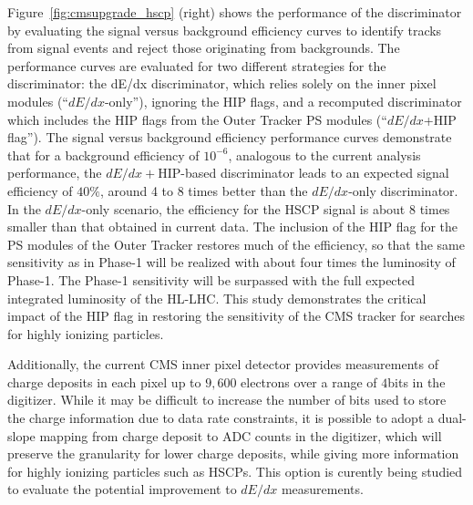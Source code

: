 Figure~\ref{fig:cmsupgrade_hscp} (right) shows the performance of the discriminator by evaluating the signal versus background
efficiency curves to identify tracks from signal events and reject those originating from backgrounds. The performance curves are evaluated for two different strategies for
the discriminator: the dE/dx discriminator, which relies solely on the inner pixel modules
(``$dE/dx$-only''), ignoring the HIP flags, and a recomputed discriminator which includes the
HIP flags from the Outer Tracker PS modules (“$dE/dx$+HIP flag”). The signal versus background
efficiency performance curves demonstrate that for a background efficiency
of $10^{-6}$, analogous to the current analysis performance, the $dE/dx+$HIP-based discriminator
leads to an expected signal efficiency of $40\%$, around 4 to 8 times better than the $dE/dx$-only
discriminator. In the $dE/dx$-only scenario, the efficiency for the HSCP signal is about 8 times
smaller than that obtained in current data. The inclusion of the HIP flag for the PS modules of the Outer Tracker restores much of the efficiency, so that the
same sensitivity as in Phase-1 will be realized with about four times the luminosity of Phase-1.
The Phase-1 sensitivity will be surpassed with the full expected integrated luminosity of the
HL-LHC. This study demonstrates the critical impact of the HIP flag in restoring the sensitivity
of the CMS tracker for searches for highly ionizing particles.

Additionally, the current CMS inner pixel detector provides measurements of charge deposits in each pixel up to $9,600$ electrons over a range of $4$bits in the digitizer. 
While it may be difficult to increase the number of bits used to store the charge information due to data rate constraints, it is possible to adopt a dual-slope mapping from charge deposit to ADC counts in the digitizer, which will preserve the granularity for lower charge deposits, while giving more information for highly ionizing particles such as HSCPs. This option is curently being studied to evaluate the potential improvement to $dE/dx$ measurements. 

